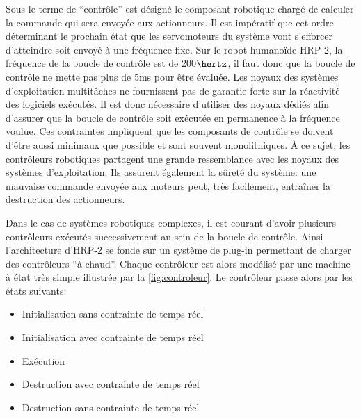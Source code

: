 Sous le terme de ``contrôle'' est désigné le composant robotique
chargé de calculer la commande qui sera envoyée aux actionneurs. Il
est impératif que cet ordre déterminant le prochain état que les
servomoteurs du système vont s'efforcer d'atteindre soit envoyé à une
fréquence fixe. Sur le robot humanoïde HRP-2, la
fréquence de la boucle de contrôle est de 200$\hertz$, il faut donc
que la boucle de contrôle ne mette pas plus de 5ms pour être
évaluée. Les noyaux des systèmes d'exploitation multitâches ne
fournissent pas de garantie forte sur la réactivité des logiciels
exécutés. Il est donc nécessaire d'utiliser des noyaux dédiés afin
d'assurer que la boucle de contrôle soit exécutée en permanence à la
fréquence voulue. Ces contraintes impliquent que les composants de
contrôle se doivent d'être aussi minimaux que possible et sont souvent
monolithiques. À ce sujet, les contrôleurs robotiques partagent une
grande ressemblance avec les noyaux des systèmes d'exploitation. Ils
assurent également la sûreté du système: une mauvaise commande envoyée
aux moteurs peut, très facilement, entraîner la destruction des
actionneurs.

Dans le cas de systèmes robotiques complexes, il est courant d'avoir
plusieurs contrôleurs exécutés successivement au sein de la boucle de
contrôle. Ainsi l'architecture d'HRP-2 se fonde sur un système de
plug-in permettant de charger des contrôleurs ``à chaud''. Chaque
contrôleur est alors modélisé par une machine à état très simple
illustrée par la \autoref{fig:controleur}. Le contrôleur passe alors
par les états suivants:

\begin{itemize}
\item Initialisation sans contrainte de temps réel
\item Initialisation avec contrainte de temps réel
\item Exécution
\item Destruction avec contrainte de temps réel
\item Destruction sans contrainte de temps réel
\end{itemize}

